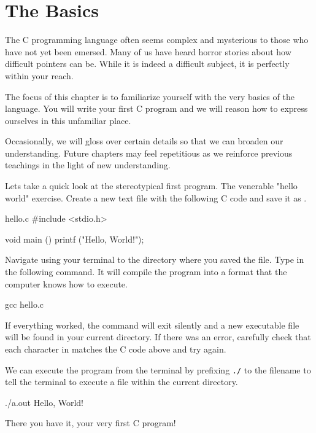 \chapter{The Basics}

The C programming language often seems complex and mysterious to those who have
not yet been emersed. Many of us have heard horror stories about how difficult
pointers can be. While it is indeed a difficult subject, it is perfectly within
your reach.

The focus of this chapter is to familiarize yourself with the very basics of
the language. You will write your first C program and we will reason how to
express ourselves in this unfamiliar place.

Occasionally, we will gloss over certain details so that we can broaden our
understanding. Future chapters may feel repetitious as we reinforce previous
teachings in the light of new understanding.

Lets take a quick look at the stereotypical first program. The venerable
"hello world" exercise. Create a new text file with the following C code and
save it as .

\begin{code}{hello.c}
#include <stdio.h>

void main ()
{
    printf ("Hello, World!\n");
}
\end{code}

Navigate using your terminal to the directory where you saved the file. Type in
the following command. It will compile the program into a format that the
computer knows how to execute.

\begin{Terminal}
gcc hello.c
\end{Terminal}

If everything worked, the  command will exit silently and a new
executable file  will be found in your current directory. If there
was an error, carefully check that each character in  matches the
C code above and try again.

We can execute the program from the terminal by prefixing \verb|./| to the
filename to tell the terminal to execute a file within the current directory.

\begin{Terminal}
./a.out
Hello, World!
\end{Terminal}

There you have it, your very first C program!


